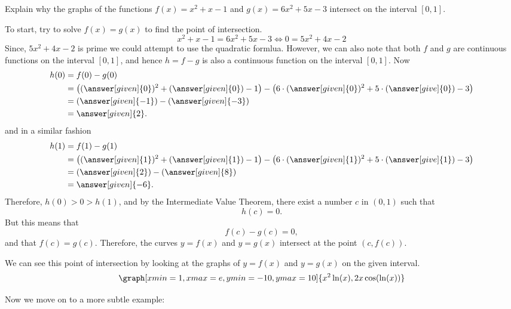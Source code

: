\documentclass{ximera}
\begin{document}
\begin{example}
  Explain why the graphs of the functions $f(x) = x^2+x-1$  and $ g(x) = 6x^2+5x-3$ intersect on the interval $[0,1]$.

  To start, try to solve $f(x)=g(x)$ to find the point of intersection.
  $$
    x^2+x-1 = 6x^2+5x-3 \iff 0 = 5x^2+4x-2
  $$
  Since, $5x^2+4x-2$ is prime we could attempt to use the quadratic formlua. However, we can also note that both $f$ and $g$ are continuous functions on the interval $[0,1]$, and
  hence $h = f-g$ is also a continuous function on the interval $[0,1]$. Now
  \begin{align*}
    h(0) &= f(0) - g(0) \\
    &= \left((\answer[given]{0})^2+ (\answer[given]{0}) - 1 \right) -
      \left( 6\cdot (\answer[given]{0})^2 + 5\cdot (\answer[give]{0}) - 3 \right)
      \\
    & = (\answer[given]{-1}) - (\answer[given]{-3})\\
    &= \answer[given]{2}.
  \end{align*}
  and in a similar fashion
   \begin{align*}
    h(1) &= f(1) - g(1) \\
    &= \left((\answer[given]{1})^2+ (\answer[given]{1}) - 1 \right) -
      \left( 6\cdot (\answer[given]{1})^2 + 5\cdot (\answer[give]{1}) - 3 \right)
      \\
    & = (\answer[given]{2}) - (\answer[given]{8})\\
    &= \answer[given]{-6}.
   \end{align*}
   Therefore, $h(0)>0>h(1)$, and by the Intermediate Value Theorem, there exist a number $c$ in $(0,1)$ such that
  \[
  h(c)=0.
  \]
    But this means that
    \[
 f(c)-g(c)=0,
  \]
  and that $f(c)=g(c)$.
  Therefore, the curves $y=f(x)$ and $y=g(x)$ intersect at the point $(c,f(c))$.

   \begin{onlineOnly}
   We can see this point of intersection by looking at the graphs of $y=f(x)$ and $y=g(x)$ on the given interval.
   \[
   \graph[xmin=1,xmax=e,ymin=-10,ymax=10]{x^2\ln(x), 2x\cos(\ln(x))}
   \]
   \end{onlineOnly}

\end{example}
Now we move on to a more subtle example:
\end{document}
